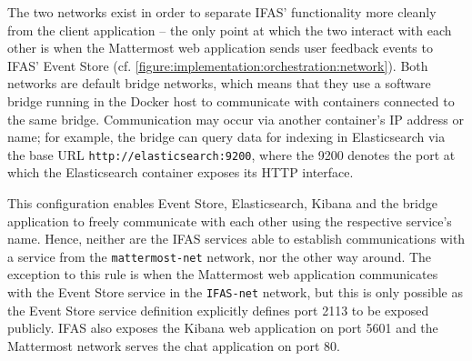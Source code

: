 The two networks exist in order to separate \ac{IFAS}' functionality more cleanly from the client application -- the only point at which the two interact with each other is when the Mattermost web application sends user feedback events to \ac{IFAS}' Event Store (cf. \cref{figure:implementation:orchestration:network}).
Both networks are default bridge networks, which means that they use a software bridge running in the Docker host to communicate with containers connected to the same bridge.
Communication may occur via another container's IP address or name; for example, the bridge can query data for indexing in Elasticsearch via the base URL \texttt{http://elasticsearch:9200}, where the 9200 denotes the port at which the Elasticsearch container exposes its \ac{HTTP} interface.

This configuration enables Event Store, Elasticsearch, Kibana and the bridge application to freely communicate with each other using the respective service's name.
Hence, neither are the \ac{IFAS} services able to establish communications with a service from the \texttt{mattermost-net} network, nor the other way around.
The exception to this rule is when the Mattermost web application communicates with the Event Store service in the \texttt{IFAS-net} network, but this is only possible as the Event Store service definition explicitly defines port 2113 to be exposed publicly.
\ac{IFAS} also exposes the Kibana web application on port 5601 and the Mattermost network serves the chat application on port 80.

